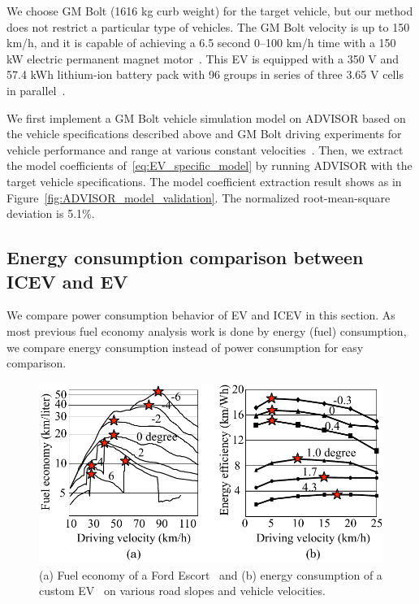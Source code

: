 \documentclass{IEEEtran}
\begin{document}
We choose GM Bolt (1616 kg curb weight) for the target vehicle, but our method does not restrict a particular type of vehicles. The GM Bolt velocity is up to 150 km/h, and it is capable of achieving a 6.5 second 0–100 km/h time with a 150 kW electric permanent magnet motor~\cite{GM_Bolt:official}. This EV is equipped with a 350 V and 57.4 kWh lithium-ion battery pack with 96 groups in series of three 3.65 V cells in parallel~\cite{GM_Bolt:spec}. 

We first implement a GM Bolt vehicle simulation model on ADVISOR based on the vehicle specifications described above and GM Bolt driving experiments for vehicle performance and range at various constant velocities~\cite{GM_Bolt:range25mph,GM_Bolt:range65mph,GM_Bolt:range75mph,GM_Bolt:range93mph}. Then, we extract the model coefficients of~\eqref{eq:EV_specific_model} by running ADVISOR with the target vehicle specifications. The model coefficient extraction result shows as in Figure~\ref{fig:ADVISOR_model_validation}. The normalized root-mean-square deviation is 5.1\%. 

\subsection{Energy consumption comparison between ICEV and EV} \label{subsec:comparison}

We compare power consumption behavior of EV and ICEV in this section. As most previous fuel economy analysis work is done by energy (fuel) consumption, we compare energy consumption instead of power consumption for easy comparison. 

\begin{figure}	%
\includegraphics[width=1.0\hsize]{Figures/ICEV_EV_consumption.pdf}
\caption{(a) Fuel economy of a Ford Escort~\cite{Hooker:TR88} and (b) energy consumption of a custom EV~\cite{Chang:ICCAD14} on various road slopes and vehicle velocities.}
\label{fig:ICEV_EV_consumption}
\end{figure} 
\end{document}
